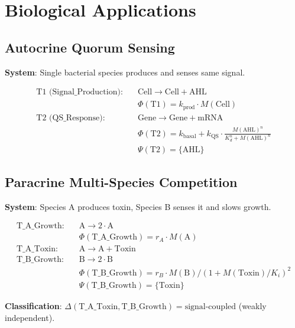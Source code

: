 \documentclass[11pt]{article}
\newcommand{\SignalSet}[1]{{\Psi(#1)}}
\newcommand{\DepType}[2]{{\Delta(#1,#2)}}
\begin{document}
\section{Biological Applications}

\subsection{Autocrine Quorum Sensing}

\textbf{System}: Single bacterial species produces and senses same signal.

\begin{equation}
\begin{aligned}
\text{T1 (Signal\_Production):} \quad &\text{Cell} \to \text{Cell} + \text{AHL} \\
&\Phi(\text{T1}) = k_{\text{prod}} \cdot M(\text{Cell}) \\
\text{T2 (QS\_Response):} \quad &\text{Gene} \to \text{Gene} + \text{mRNA} \\
&\Phi(\text{T2}) = k_{\text{basal}} + k_{\text{QS}} \cdot \frac{M(\text{AHL})^n}{K_d^n + M(\text{AHL})^n} \\
&\SignalSet{\text{T2}} = \{\text{AHL}\}
\end{aligned}
\end{equation}

\subsection{Paracrine Multi-Species Competition}

\textbf{System}: Species A produces toxin, Species B senses it and slows growth.

\begin{equation}
\begin{aligned}
\text{T\_A\_Growth:} \quad &\text{A} \to 2 \cdot \text{A} \\
&\Phi(\text{T\_A\_Growth}) = r_A \cdot M(\text{A}) \\
\text{T\_A\_Toxin:} \quad &\text{A} \to \text{A} + \text{Toxin} \\
\text{T\_B\_Growth:} \quad &\text{B} \to 2 \cdot \text{B} \\
&\Phi(\text{T\_B\_Growth}) = r_B \cdot M(\text{B}) / (1 + M(\text{Toxin})/K_i)^2 \\
&\SignalSet{\text{T\_B\_Growth}} = \{\text{Toxin}\}
\end{aligned}
\end{equation}

\textbf{Classification}: $\DepType{\text{T\_A\_Toxin}}{\text{T\_B\_Growth}} = \text{signal-coupled}$ (weakly independent).
\end{document}
